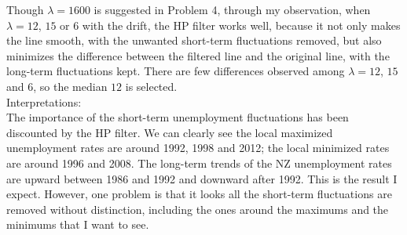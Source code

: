 \documentclass[10pt]{article}
\begin{document}
\begin{enumerate}[1)]
Though $\lambda=1600$ is suggested in Problem 4, through my observation, when $\lambda=12$, $15$ or $6$ with the drift, the HP filter works well, because it not only makes the line smooth, with the unwanted short-term fluctuations removed, but also minimizes the difference between the filtered line and the original line, with the long-term fluctuations kept. There are few differences observed among $\lambda=12$, $15$ and $6$, so the median $12$ is selected.\\
Interpretations:\\
The importance of the short-term unemployment fluctuations has been discounted by the HP filter. We can clearly see the local maximized unemployment rates are around 1992, 1998 and 2012; the local minimized rates are around 1996 and 2008. The long-term trends of the NZ unemployment rates are upward between 1986 and 1992 and downward after 1992. This is the result I expect. However, one problem is that it looks all the short-term fluctuations are removed without distinction, including the ones around the maximums and the minimums that I want to see.

\end{enumerate}
\end{document}
